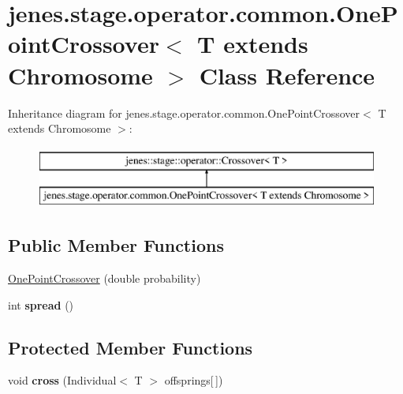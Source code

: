 \hypertarget{classjenes_1_1stage_1_1operator_1_1common_1_1_one_point_crossover_3_01_t_01extends_01_chromosome_01_4}{\section{jenes.\-stage.\-operator.\-common.\-One\-Point\-Crossover$<$ T extends Chromosome $>$ Class Reference}
\label{classjenes_1_1stage_1_1operator_1_1common_1_1_one_point_crossover_3_01_t_01extends_01_chromosome_01_4}
}
Inheritance diagram for jenes.\-stage.\-operator.\-common.\-One\-Point\-Crossover$<$ T extends Chromosome $>$\-:\begin{figure}[H]
\begin{center}
\leavevmode
\includegraphics[height=2.000000cm]{classjenes_1_1stage_1_1operator_1_1common_1_1_one_point_crossover_3_01_t_01extends_01_chromosome_01_4}
\end{center}
\end{figure}
\subsection*{Public Member Functions}
\begin{DoxyCompactItemize}
\item 
\hyperlink{classjenes_1_1stage_1_1operator_1_1common_1_1_one_point_crossover_3_01_t_01extends_01_chromosome_01_4_a441a51f325e76aa282250ecf2c464635}{One\-Point\-Crossover} (double probability)
\item 
\hypertarget{classjenes_1_1stage_1_1operator_1_1common_1_1_one_point_crossover_3_01_t_01extends_01_chromosome_01_4_a7f29facf7cb0e3baec284ec72730c8c0}{int {\bfseries spread} ()}\label{classjenes_1_1stage_1_1operator_1_1common_1_1_one_point_crossover_3_01_t_01extends_01_chromosome_01_4_a7f29facf7cb0e3baec284ec72730c8c0}

\end{DoxyCompactItemize}
\subsection*{Protected Member Functions}
\begin{DoxyCompactItemize}
\item 
\hypertarget{classjenes_1_1stage_1_1operator_1_1common_1_1_one_point_crossover_3_01_t_01extends_01_chromosome_01_4_ad8963f25110079a5444d2a0a61d3d1a5}{void {\bfseries cross} (Individual$<$ T $>$ offsprings\mbox{[}$\,$\mbox{]})}\label{classjenes_1_1stage_1_1operator_1_1common_1_1_one_point_crossover_3_01_t_01extends_01_chromosome_01_4_ad8963f25110079a5444d2a0a61d3d1a5}

\end{DoxyCompactItemize}


